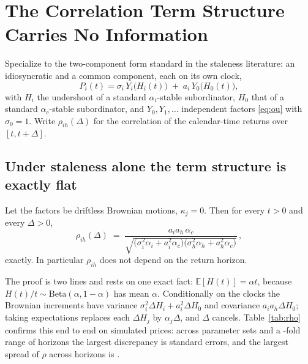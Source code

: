 \documentclass{ws-ijtaf}
\newcommand{\E}{\mathbb{E}}
\newcommand{\Bet}{\mathrm{Beta}}
\begin{document}
\section{The Correlation Term Structure Carries No Information}\label{sec:corr}

Specialize to the two-component form standard in the staleness literature: an
idiosyncratic and a common component, each on its own clock,
\begin{equation}
P_i(t) = \sigma_i\, Y_i\big(H_i(t)\big) \;+\; a_i\, Y_0\big(H_0(t)\big),
\label{eq:twofactor}
\end{equation}
with $H_i$ the undershoot of a standard $\alpha_i$-stable subordinator, $H_0$
that of a standard $\alpha_c$-stable subordinator, and $Y_0,Y_1,\dots$
independent factors \eqref{eq:ou} with $\sigma_0=1$. Write $\rho_{ih}(\Delta)$
for the correlation of the calendar-time returns over $[t,t+\Delta]$.

\subsection{Under staleness alone the term structure is exactly flat}

\begin{proposition}\label{prop:rhoflat}
Let the factors be driftless Brownian motions, $\kappa_j=0$. Then for every
$t>0$ and every $\Delta>0$,
\begin{equation}
\rho_{ih}(\Delta) \;=\;
\frac{a_i a_h\, \alpha_c}
     {\sqrt{\big(\sigma_i^2\alpha_i + a_i^2\alpha_c\big)
            \big(\sigma_h^2\alpha_h + a_h^2\alpha_c\big)}}\, ,
\label{eq:rhoflat}
\end{equation}
exactly. In particular $\rho_{ih}$ does not depend on the return horizon.
\end{proposition}

The proof is two lines and rests on one exact fact: $\E[H(t)]=\alpha t$, because
$H(t)/t\sim\Bet(\alpha,1-\alpha)$ has mean $\alpha$. Conditionally on the
clocks the Brownian increments have variance $\sigma_i^2\Delta H_i +
a_i^2\Delta H_0$ and covariance $a_ia_h\Delta H_0$; taking expectations
replaces each $\Delta H_j$ by $\alpha_j\Delta$, and $\Delta$ cancels.
Table~\ref{tab:rho} confirms this end to end on simulated prices: across
\rhoNCases{} parameter sets and a \rhoDeltaRatio{}-fold range of horizons the
largest discrepancy is \rhoBrownMaxZ{} standard errors, and the largest spread
of $\rho$ across horizons is \rhoBrownSpread{}.
\end{document}
